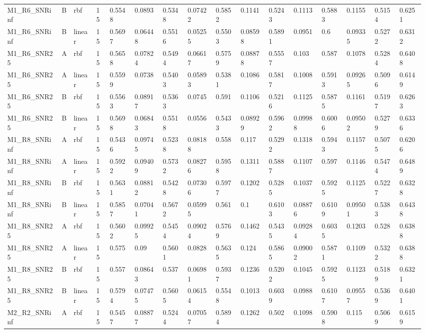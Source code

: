 \begin{tabular}{llllllllllllllll}
M1\_R6\_SNRinf & B & rbf & 15 & 0.5548 & 0.0893 & 0.5348 & 0.07422 & 0.5852 & 0.1141 & 0.5243 & 0.1113 & 0.5883 & 0.1155 & 0.5154 & 0.6251 \\
M1\_R6\_SNRinf & B & linear & 15 & 0.5697 & 0.06448 & 0.5516 & 0.05255 & 0.5503 & 0.08598 & 0.5891 & 0.0951 & 0.6 & 0.09335 & 0.5272 & 0.6312 \\
M1\_R6\_SNR25 & A & rbf & 15 & 0.5658 & 0.07824 & 0.5494 & 0.06617 & 0.5759 & 0.08878 & 0.5557 & 0.103 & 0.587 & 0.1078 & 0.5284 & 0.6408 \\
M1\_R6\_SNR25 & A & linear & 15 & 0.5599 & 0.0738 & 0.5403 & 0.05893 & 0.5381 & 0.1086 & 0.5817 & 0.1008 & 0.5913 & 0.09265 & 0.5096 & 0.6149 \\
M1\_R6\_SNR25 & B & rbf & 15 & 0.5563 & 0.08917 & 0.5363 & 0.0745 & 0.591 & 0.1106 & 0.5216 & 0.1125 & 0.5875 & 0.1161 & 0.5197 & 0.6263 \\
M1\_R6\_SNR25 & B & linear & 15 & 0.5698 & 0.06843 & 0.5518 & 0.0556 & 0.5433 & 0.08929 & 0.5962 & 0.09988 & 0.6006 & 0.09502 & 0.5279 & 0.6336 \\
M1\_R8\_SNRinf & A & rbf & 15 & 0.5436 & 0.09745 & 0.5238 & 0.08188 & 0.558 & 0.117 & 0.5292 & 0.1318 & 0.5943 & 0.1157 & 0.5075 & 0.6206 \\
M1\_R8\_SNRinf & A & linear & 15 & 0.5922 & 0.09409 & 0.5732 & 0.08276 & 0.5958 & 0.1311 & 0.5887 & 0.1107 & 0.597 & 0.1146 & 0.5474 & 0.6489 \\
M1\_R8\_SNRinf & B & rbf & 15 & 0.5631 & 0.08812 & 0.5428 & 0.07306 & 0.5977 & 0.1202 & 0.5285 & 0.1037 & 0.5925 & 0.1125 & 0.5227 & 0.6328 \\
M1\_R8\_SNRinf & B & linear & 15 & 0.5857 & 0.07041 & 0.5672 & 0.05995 & 0.561 & 0.1 & 0.6103 & 0.08876 & 0.6109 & 0.09501 & 0.5383 & 0.6438 \\
M1\_R8\_SNR25 & A & rbf & 15 & 0.5602 & 0.09925 & 0.5454 & 0.09024 & 0.5769 & 0.1462 & 0.5435 & 0.09284 & 0.6035 & 0.1203 & 0.528 & 0.6388 \\
M1\_R8\_SNR25 & A & linear & 15 & 0.575 & 0.09 & 0.5601 & 0.0828 & 0.5635 & 0.124 & 0.5865 & 0.09002 & 0.5871 & 0.1109 & 0.5322 & 0.6388 \\
M1\_R8\_SNR25 & B & rbf & 15 & 0.557 & 0.08643 & 0.537 & 0.06981 & 0.5937 & 0.1236 & 0.5202 & 0.1045 & 0.5925 & 0.1123 & 0.5189 & 0.6321 \\
M1\_R8\_SNR25 & B & linear & 15 & 0.5794 & 0.07475 & 0.5605 & 0.06154 & 0.5548 & 0.1013 & 0.6039 & 0.0988 & 0.6107 & 0.09557 & 0.5369 & 0.6401 \\
M2\_R2\_SNRinf & A & rbf & 15 & 0.5457 & 0.08877 & 0.5244 & 0.07057 & 0.5894 & 0.1262 & 0.502 & 0.1098 & 0.5908 & 0.115 & 0.5069 & 0.6159 \\

\end{tabular}
